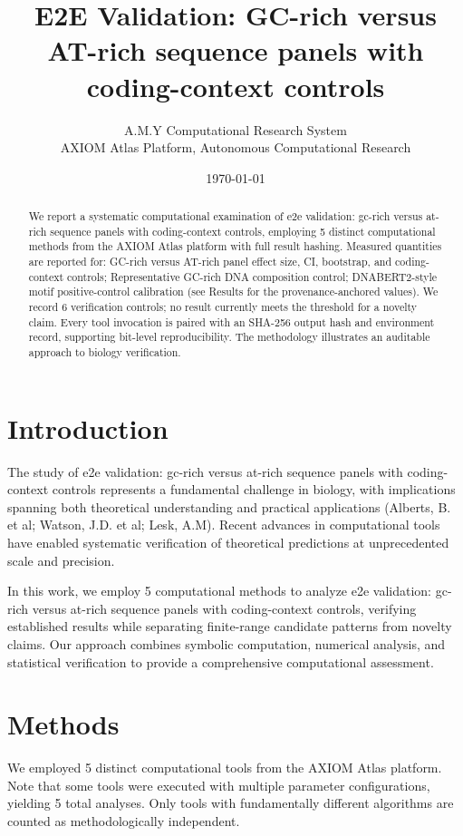 \documentclass[11pt,a4paper]{article}
\title{E2E Validation: GC-rich versus AT-rich sequence panels with coding-context controls}
\author{A.M.Y Computational Research System\\
\small AXIOM Atlas Platform, Autonomous Computational Research}
\date{\today}
\begin{document}
\maketitle

\begin{abstract}
We report a systematic computational examination of e2e validation: gc-rich versus at-rich sequence panels with coding-context controls, employing 5 distinct computational methods from the AXIOM Atlas platform with full result hashing. Measured quantities are reported for: GC-rich versus AT-rich panel effect size, CI, bootstrap, and coding-context controls; Representative GC-rich DNA composition control; DNABERT2-style motif positive-control calibration (see Results for the provenance-anchored values). We record 6 verification controls; no result currently meets the threshold for a novelty claim. Every tool invocation is paired with an SHA-256 output hash and environment record, supporting bit-level reproducibility. The methodology illustrates an auditable approach to biology verification.
\end{abstract}

\section{Introduction}
The study of e2e validation: gc-rich versus at-rich sequence panels with coding-context controls represents a fundamental challenge in biology, with implications spanning both theoretical understanding and practical applications (Alberts, B. et al; Watson, J.D. et al; Lesk, A.M). Recent advances in computational tools have enabled systematic verification of theoretical predictions at unprecedented scale and precision.

In this work, we employ 5 computational methods to analyze e2e validation: gc-rich versus at-rich sequence panels with coding-context controls, verifying established results while separating finite-range candidate patterns from novelty claims. Our approach combines symbolic computation, numerical analysis, and statistical verification to provide a comprehensive computational assessment.


\section{Methods}
We employed 5 distinct computational tools from the AXIOM Atlas platform. Note that some tools were executed with multiple parameter configurations, yielding 5 total analyses. Only tools with fundamentally different algorithms are counted as methodologically independent.
\end{document}
